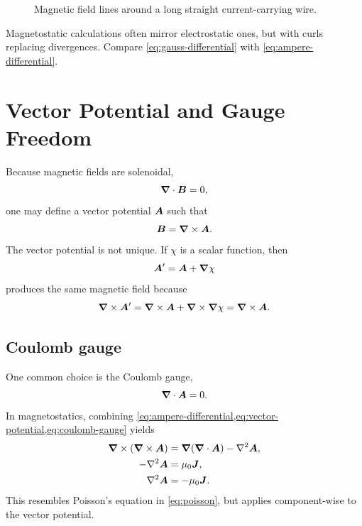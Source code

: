 \begin{figure}[h]
\centering
{}
\caption{Magnetic field lines around a long straight current-carrying wire.}
\label{fig:wire-field}
\end{figure}

Magnetostatic calculations often mirror electrostatic ones, but with curls replacing divergences.
Compare \cref{eq:gauss-differential} with \cref{eq:ampere-differential}.

\newpage

\section{Vector Potential and Gauge Freedom}
\label{sec:vector-potential}

Because magnetic fields are solenoidal,
\begin{equation}
  \bm{\nabla} \cdot \bm{B} = 0,
  \label{eq:no-monopoles}
\end{equation}
one may define a vector potential \(\bm{A}\) such that
\begin{equation}
  \bm{B} = \bm{\nabla} \times \bm{A}.
  \label{eq:vector-potential}
\end{equation}
The vector potential is not unique. If \(\chi\) is a scalar function, then
\begin{equation}
  \bm{A}' = \bm{A} + \bm{\nabla} \chi
\end{equation}
produces the same magnetic field because
\begin{equation}
  \bm{\nabla} \times \bm{A}'
  =
  \bm{\nabla} \times \bm{A}
  +
  \bm{\nabla} \times \bm{\nabla} \chi
  =
  \bm{\nabla} \times \bm{A}.
\end{equation}

\subsection{Coulomb gauge}

One common choice is the Coulomb gauge,
\begin{equation}
  \bm{\nabla} \cdot \bm{A} = 0.
  \label{eq:coulomb-gauge}
\end{equation}
In magnetostatics, combining \cref{eq:ampere-differential,eq:vector-potential,eq:coulomb-gauge} yields
\begin{align}
  \bm{\nabla} \times(\bm{\nabla} \times\bm{A})
  &=
  \bm{\nabla}(\bm{\nabla} \cdot\bm{A})-\nabla^2\bm{A}, \\
  -\nabla^2\bm{A}
  &=
  \mu_0 \bm{J}, \\
  \nabla^2\bm{A}
  &=
  -\mu_0\bm{J}.
  \label{eq:vector-poisson}
\end{align}
This resembles Poisson's equation in \cref{eq:poisson}, but applies component-wise to the vector potential.

